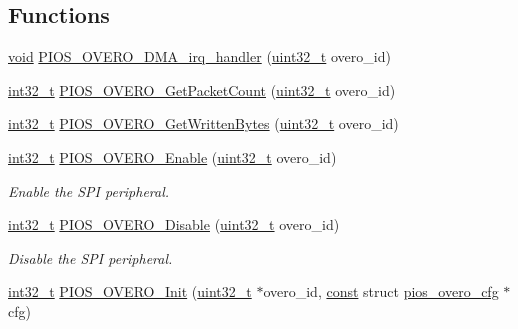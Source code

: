 \subsection*{Functions}
\begin{DoxyCompactItemize}
\item 
\hyperlink{group___n_a_m_e_ga18028b8badbf1ea7e704ccac3c488e82}{void} \hyperlink{group___p_i_o_s___o_v_e_r_o_ga33d7651a225f8feaebee0da7b806d6f3}{P\-I\-O\-S\-\_\-\-O\-V\-E\-R\-O\-\_\-\-D\-M\-A\-\_\-irq\-\_\-handler} (\hyperlink{stdint_8h_a435d1572bf3f880d55459d9805097f62}{uint32\-\_\-t} overo\-\_\-id)
\item 
\hyperlink{group___n_a_m_e_gafd12020da5a235dfcf0c3c748fb5baed}{int32\-\_\-t} \hyperlink{group___p_i_o_s___o_v_e_r_o_gaca2a7dbfbba27c8016063572c884f0fe}{P\-I\-O\-S\-\_\-\-O\-V\-E\-R\-O\-\_\-\-Get\-Packet\-Count} (\hyperlink{stdint_8h_a435d1572bf3f880d55459d9805097f62}{uint32\-\_\-t} overo\-\_\-id)
\item 
\hyperlink{group___n_a_m_e_gafd12020da5a235dfcf0c3c748fb5baed}{int32\-\_\-t} \hyperlink{group___p_i_o_s___o_v_e_r_o_ga964b1603e8379e322e04ae308d4f931c}{P\-I\-O\-S\-\_\-\-O\-V\-E\-R\-O\-\_\-\-Get\-Written\-Bytes} (\hyperlink{stdint_8h_a435d1572bf3f880d55459d9805097f62}{uint32\-\_\-t} overo\-\_\-id)
\item 
\hyperlink{group___n_a_m_e_gafd12020da5a235dfcf0c3c748fb5baed}{int32\-\_\-t} \hyperlink{group___p_i_o_s___o_v_e_r_o_gaa548fd4048405d2ea1016f302bd077fa}{P\-I\-O\-S\-\_\-\-O\-V\-E\-R\-O\-\_\-\-Enable} (\hyperlink{stdint_8h_a435d1572bf3f880d55459d9805097f62}{uint32\-\_\-t} overo\-\_\-id)
\begin{DoxyCompactList}\small\item\em Enable the S\-P\-I peripheral. \end{DoxyCompactList}\item 
\hyperlink{group___n_a_m_e_gafd12020da5a235dfcf0c3c748fb5baed}{int32\-\_\-t} \hyperlink{group___p_i_o_s___o_v_e_r_o_ga4ea04c150565308d37d3df5166c2ec71}{P\-I\-O\-S\-\_\-\-O\-V\-E\-R\-O\-\_\-\-Disable} (\hyperlink{stdint_8h_a435d1572bf3f880d55459d9805097f62}{uint32\-\_\-t} overo\-\_\-id)
\begin{DoxyCompactList}\small\item\em Disable the S\-P\-I peripheral. \end{DoxyCompactList}\item 
\hyperlink{group___n_a_m_e_gafd12020da5a235dfcf0c3c748fb5baed}{int32\-\_\-t} \hyperlink{group___p_i_o_s___o_v_e_r_o_ga6aa066f1ee4dee8fd2766d10f9833a97}{P\-I\-O\-S\-\_\-\-O\-V\-E\-R\-O\-\_\-\-Init} (\hyperlink{stdint_8h_a435d1572bf3f880d55459d9805097f62}{uint32\-\_\-t} $\ast$overo\-\_\-id, \hyperlink{group___n_a_m_e_ga7ae6d0e43244213b34de2c2b9aa30da6}{const} struct \hyperlink{structpios__overo__cfg}{pios\-\_\-overo\-\_\-cfg} $\ast$cfg)
\end{DoxyCompactItemize}
